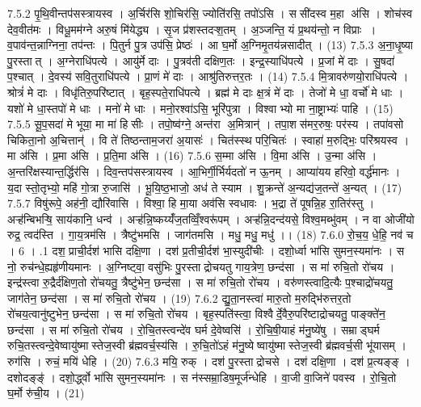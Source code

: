 7.5.2
पृ॒थि॒वीन्तप॑सस्त्रायस्व । अ॒र्चिर॑सि शो॒चिर॑सि॒ ज्योति॑रसि॒ तपो॑ऽसि । ससी॑दस्व म॒हा अ॑सि । शोच॑स्व देव॒वीत॑मः । विधू॒मम॑ग्ने अरु॒षं मि॑येद्ध्य । सृ॒ज प्र॑शस्तदऱ्श॒तम् । अ॒ञ्जन्ति॒ यं प्र॒थय॑न्तो॒ न विप्राः । व॒पाव॑न्त॒न्नाग्निना॒ तप॑न्तः । पि॒तुर्न पु॒त्र उप॑सि॒ प्रेष्ठः॑ । आ घ॒र्मो अ॒ग्निमृ॒तय॑न्नसादीत् । (13)
7.5.3
अ॒ना॒धृ॒ष्या पु॒रस्तात् । अ॒ग्नेराधि॑पत्ये । आयु॑र्मे दाः । पु॒त्रव॑ती दक्षिण॒तः । इन्द्र॒स्याधि॑पत्ये । प्र॒जां मे॑ दाः । सु॒षदा॑ प॒श्चात् । दे॒वस्य॑ सवि॒तुराधि॑पत्ये । प्रा॒णं मे॑ दाः । आश्रु॑तिरुत्तर॒तः । (14)
7.5.4
मि॒त्रावरु॑णयो॒राधि॑पत्ये । श्रोत्रं॑ मे दाः । विधृ॑तिरु॒परि॑ष्टात् । बृह॒स्पते॒राधि॑पत्ये । ब्रह्म॑ मे दाः क्ष॒त्रं मे॑ दाः । तेजो॑ मे धा॒ वर्चो॑ मे धाः । यशो॑ मे धा॒स्तपो॑ मे धाः । मनो॑ मे धाः । मनो॒रश्वा॑ऽसि॒ भूरि॑पुत्रा । विश्वाभ्यो मा ना॒ष्ट्राभ्यः॑ पाहि । (15)
7.5.5
सू॒प॒सदा॑ मे भूया॒ मा मा॑ हिसीः । तपो॒ष्व॑ग्ने॒ अन्त॑रा अ॒मित्रान्॑ । तपा॒शस॑मर॒रुषः॒ पर॑स्य । तपा॑वसो चिकिता॒नो अ॒चित्तान्॑ । वि ते॑ तिष्ठन्ताम॒जरा॑ अ॒यासः॑ । चित॑स्स्थ परि॒चितः॑ । स्वाहा॑ म॒रुद्भिः॒ परि॑श्रयस्व । मा अ॑सि । प्र॒मा अ॑सि । प्र॒ति॒मा अ॑सि । (16)
7.5.6
स॒म्मा अ॑सि । वि॒मा अ॑सि । उ॒न्मा अ॑सि । अ॒न्तरि॑क्षस्यान्त॒र्द्धिर॑सि । दिव॒न्तप॑सस्त्रायस्व । आ॒भिर्गी॒र्भिर्यदतो॑ न ऊ॒नम् । आप्या॑यय हरिवो॒ वर्द्ध॑मानः । य॒दा स्तो॒तृभ्यो॒ महि॑ गो॒त्रा रु॒जासि॑ । भू॒यि॒ष्ठ॒भाजो॒ अध॑ ते स्याम । शु॒क्रन्ते॑ अ॒न्यद्य॑ज॒तन्ते॑ अ॒न्यत् । (17)
7.5.7
विषु॑रूपे॒ अह॑नी॒ द्यौरि॑वासि । विश्वा॒ हि मा॒या अव॑सि स्वधावः । भ॒द्रा ते॑ पूषन्नि॒ह रा॒तिर॑स्तु । अऱ्ह॑न्बिभऱ्षि॒ साय॑कानि॒ धन्व॑ । अऱ्ह॑न्नि॒ष्कय्यँ॑ज॒तव्विँ॒श्वरू॑पम् । अऱ्ह॑न्नि॒दन्द॑यसे॒ विश्व॒मब्भु॑वम् । न वा ओजी॑यो रुद्र॒ त्वद॑स्ति । गा॒य॒त्रम॑सि । त्रैष्टु॑भमसि । जाग॑तमसि । मधु॒ मधु॒ मधु॑ ।। (18)
7.6.0
रो॒च॒य॒ धे॒हि॒ नव॑ च । 6 ।
.1
दश॒ प्राची॒र्दश॑ भासि दक्षि॒णा । दश॑ प्र॒तीची॒र्दश॑ भा॒स्युदी॑चीः । दशो॒र्ध्वा भा॑सि सुमन॒स्यमा॑नः । स नो॒ रुच॑न्धे॒ह्यहृ॑णीयमानः । अ॒ग्निष्ट्वा॒ वसु॑भिः पु॒रस्ताद्रोचयतु गाय॒त्रेण॒ छन्द॑सा । स मा॑ रुचि॒तो रो॑चय । इन्द्र॑स्त्वा रु॒द्रैर्द॑क्षिण॒तो रो॑चयतु॒ त्रैष्टु॑भेन॒ छन्द॑सा । स मा॑ रुचि॒तो रो॑चय । वरु॑णस्त्वादि॒त्यैः प॒श्चाद्रो॑चयतु॒ जाग॑तेन॒ छन्द॑सा । स मा॑ रुचि॒तो रो॑चय । (19)
7.6.2
द्यु॒ता॒नस्त्वा॑ मारु॒तो म॒रुद्भि॑रुत्तर॒तो रो॑चय॒त्वानु॑ष्टुभेन॒ छन्द॑सा । स मा॑ रुचि॒तो रो॑चय । बृह॒स्पति॑स्त्वा॒ विश्वैर्दे॒वैरु॒परि॑ष्टाद्रोचयतु॒ पाङ्क्ते॑न॒ छन्द॑सा । स मा॑ रुचि॒तो रो॑चय । रो॒चि॒तस्त्वन्दे॑व घर्म दे॒वेष्वसि॑ । रो॒चि॒षी॒याहं म॑नु॒ष्ये॑षु । सम्राड्घर्म रुचि॒तस्त्वन्दे॒वेष्वायु॑ष्मास्तेज॒स्वी ब्र॑ह्मवर्च॒स्य॑सि । रु॒चि॒तो॑ऽहं म॑नु॒ष्येष्वायु॑ष्मास्तेज॒स्वी ब्र॑ह्मवर्च॒सी भू॑यासम् । रुग॑सि । रुचं॒ मयि॑ धेहि । (20)
7.6.3
मयि॒ रुक् । दश॑ पु॒रस्ताद्रोचसे । दश॑ दक्षि॒णा । दश॑ प्र॒त्यङ्ङ् । दशोदङ्ङ्॑ । दशो॒र्द्ध्वो भा॑सि सुमन॒स्यमा॑नः । स न॑स्सम्रा॒डिष॒मूर्ज॑न्धेहि । वा॒जी वा॒जिने॑ पवस्व । रो॒चि॒तो घ॒र्मो रु॑ची॒य । (21)
